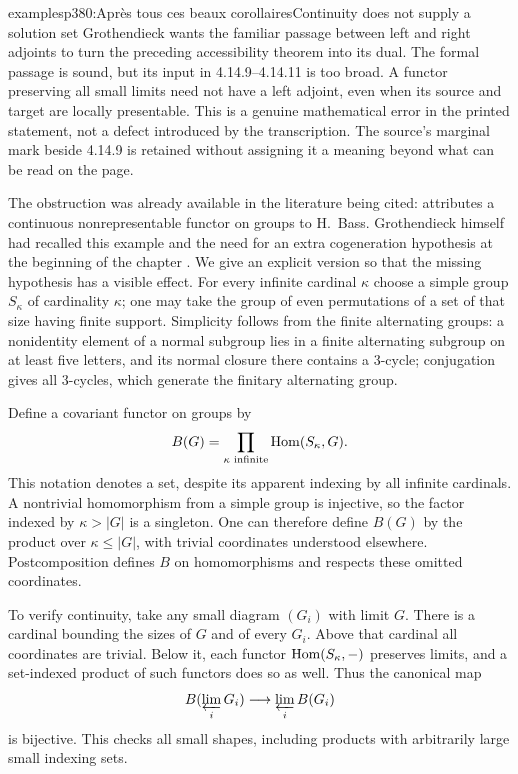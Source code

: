 \begin{dcomment}{examples}{p380:Après tous ces beaux corollaires}{Continuity does not supply a solution set}
Grothendieck wants the familiar passage between left and right adjoints to turn the preceding accessibility theorem into its dual. The formal passage is sound, but its input in 4.14.9--4.14.11 is too broad. A functor preserving all small limits need not have a left adjoint, even when its source and target are locally presentable. This is a genuine mathematical error in the printed statement, not a defect introduced by the transcription. The source's marginal mark beside 4.14.9 is retained without assigning it a meaning beyond what can be read on the page.

The obstruction was already available in the literature being cited: \citet[Expos\'e~I, Example~8.12.9]{SGA4I1972} attributes a continuous nonrepresentable functor on groups to H.~Bass. Grothendieck himself had recalled this example and the need for an extra cogeneration hypothesis at the beginning of the chapter \citep[ms.~50--52]{Grothendieck1990XVIII}. We give an explicit version so that the missing hypothesis has a visible effect. For every infinite cardinal $\kappa$ choose a simple group $S_\kappa$ of cardinality $\kappa$; one may take the group of even permutations of a set of that size having finite support. Simplicity follows from the finite alternating groups: a nonidentity element of a normal subgroup lies in a finite alternating subgroup on at least five letters, and its normal closure there contains a $3$-cycle; conjugation gives all $3$-cycles, which generate the finitary alternating group.

Define a covariant functor on groups by
\[
 B(G)=\prod_{\kappa\text{ infinite}}\operatorname{Hom}(S_\kappa,G).
\]
This notation denotes a set, despite its apparent indexing by all infinite cardinals. A nontrivial homomorphism from a simple group is injective, so the factor indexed by $\kappa>|G|$ is a singleton. One can therefore define $B(G)$ by the product over $\kappa\leq|G|$, with trivial coordinates understood elsewhere. Postcomposition defines $B$ on homomorphisms and respects these omitted coordinates.

To verify continuity, take any small diagram $(G_i)$ with limit $G$. There is a cardinal bounding the sizes of $G$ and of every $G_i$. Above that cardinal all coordinates are trivial. Below it, each functor $\operatorname{Hom}(S_\kappa,-)$ preserves limits, and a set-indexed product of such functors does so as well. Thus the canonical map
\[
 B(\varprojlim_iG_i)\longrightarrow\varprojlim_iB(G_i)
\]
is bijective. This checks all small shapes, including products with arbitrarily large small indexing sets.


\end{dcomment}
